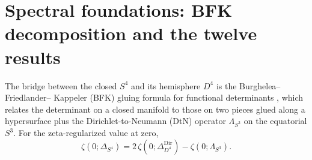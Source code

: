 \documentclass[11pt,a4paper]{article}
\theoremstyle{plain}
\theoremstyle{definition}
\theoremstyle{remark}
\begin{document}
\section{Spectral foundations: BFK decomposition and the twelve results}
\label{sec:spectral}

The bridge between the closed $S^4$ and its hemisphere $D^4$ is the Burghelea--Friedlander--
Kappeler (BFK) gluing formula for functional determinants \cite{BFK1992}, which relates the
determinant on a closed manifold to those on two pieces glued along a hypersurface plus the
Dirichlet-to-Neumann (DtN) operator $\Lambda_{S^3}$ on the equatorial $S^3$. For the
zeta-regularized value at zero,
\begin{equation}
\label{eq:bfk}
\zeta(0;\Delta_{S^4}) = 2\,\zeta(0;\Delta_{D^4}^{\mathrm{Dir}}) - \zeta(0;\Lambda_{S^3}).
\end{equation}
\end{document}

